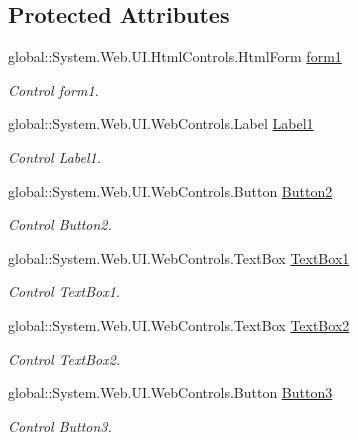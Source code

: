 \subsection*{Protected Attributes}
\begin{DoxyCompactItemize}
\item 
global\+::\+System.\+Web.\+U\+I.\+Html\+Controls.\+Html\+Form \mbox{\hyperlink{class_inicio_1_1_registrados_a902f9075b41d6386d17242fe32dea6e4}{form1}}
\begin{DoxyCompactList}\small\item\em Control form1. \end{DoxyCompactList}\item 
global\+::\+System.\+Web.\+U\+I.\+Web\+Controls.\+Label \mbox{\hyperlink{class_inicio_1_1_registrados_a89cbfd8509272c14e26ee466a11b7835}{Label1}}
\begin{DoxyCompactList}\small\item\em Control Label1. \end{DoxyCompactList}\item 
global\+::\+System.\+Web.\+U\+I.\+Web\+Controls.\+Button \mbox{\hyperlink{class_inicio_1_1_registrados_a92bb41484c2ad0de40bf04ea1ad2c868}{Button2}}
\begin{DoxyCompactList}\small\item\em Control Button2. \end{DoxyCompactList}\item 
global\+::\+System.\+Web.\+U\+I.\+Web\+Controls.\+Text\+Box \mbox{\hyperlink{class_inicio_1_1_registrados_a2ec529c41bccbe1d45b53e29aad8d1f4}{Text\+Box1}}
\begin{DoxyCompactList}\small\item\em Control Text\+Box1. \end{DoxyCompactList}\item 
global\+::\+System.\+Web.\+U\+I.\+Web\+Controls.\+Text\+Box \mbox{\hyperlink{class_inicio_1_1_registrados_a14706b4c2eeec2fe1d93f7d0ae00993c}{Text\+Box2}}
\begin{DoxyCompactList}\small\item\em Control Text\+Box2. \end{DoxyCompactList}\item 
global\+::\+System.\+Web.\+U\+I.\+Web\+Controls.\+Button \mbox{\hyperlink{class_inicio_1_1_registrados_ac3990a81617665a0ef39beeb50d83806}{Button3}}
\begin{DoxyCompactList}\small\item\em Control Button3. \end{DoxyCompactList}\item 

\end{DoxyCompactItemize}
